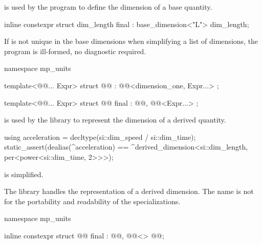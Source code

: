\pnum
{} is used by the program
to define the dimension of a base quantity.
\begin{example}
\begin{codeblock}
inline constexpr struct dim_length final : base_dimension<"L"> {} dim_length;
\end{codeblock}
\end{example}

\pnum
If  is not unique in the base dimensions
when simplifying a list of dimensions,
the program is ill-formed, no diagnostic required.

\begin{codeblock}
namespace mp_units {

template<@@... Expr>
struct @@ : @@<dimension_one, Expr...> {};

template<@@... Expr>
struct @@ final : @@, @@<Expr...> {};

}
\end{codeblock}

\pnum
{} is used by the library
to represent the dimension of a derived quantity.
\begin{example}
\begin{codeblock}
using acceleration = decltype(si::dim_speed / si::dim_time);
static_assert(dealias(^acceleration) ==
              ^derived_dimension<si::dim_length, per<power<si::dim_time, 2>>>);
\end{codeblock}
\end{example}

\pnum
\mandates
{} is simplified.
\begin{note}
The library handles the representation of a derived dimension.
The name is not \expos{} for the portability and readability of the specializations.
\end{note}

\begin{codeblock}
namespace mp_units {

inline constexpr struct @@ final : @@, @@<> {
} @@;

}
\end{codeblock}

